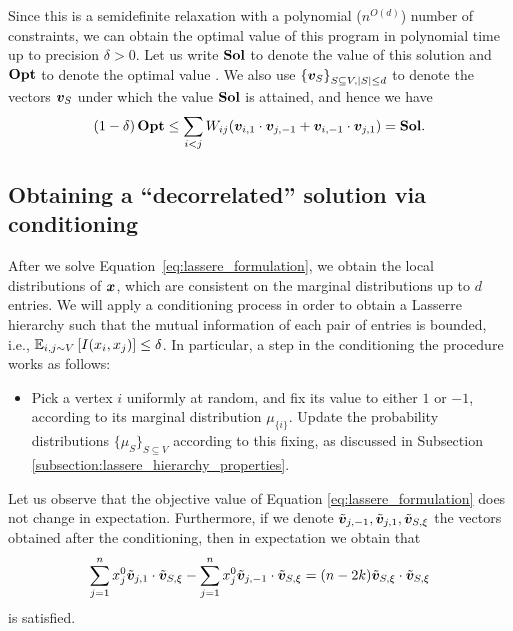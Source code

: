 Since this is a semidefinite relaxation with a polynomial ($n^{O(d)}$) number of
constraints, we can obtain the optimal value of this program in polynomial time
up to precision $\delta>0$. Let us write $\mathbf{Sol}$ to denote the value of this solution and $\OPT$ to denote the optimal value \maxcutkc. We also use $\left \{\bm{v}_S\right\}_{S \subseteq V, |S| \leq d}$ to denote the vectors $\bm{v}_S$  under which the value $\mathbf{Sol}$ is attained, and hence we have 
\begin{equation*}
	(1-\delta)\OPT \leq  \sum_{ i < j } W_{ij} (\vecv_{i,1} \cdot \vecv_{j,-1} + \vecv_{i,-1} \cdot \vecv_{j,1}) = \Sol.
\end{equation*}


\subsection{Obtaining a ``decorrelated'' solution via conditioning}
\label{appendix:lasserre:decorrelate}

After we solve Equation~\eqref{eq:lassere_formulation}, we obtain the local distributions of $\bm{x}$, which are consistent on the marginal distributions up to $d$ entries. 
We will apply a conditioning process in order to obtain a Lasserre hierarchy
such that the mutual information of each pair of entries is bounded, i.e.,
$\operatorname*{\mathbb{E}}_{i,j \sim V} \left[ I(x_i, x_j)\right] \leq \delta$. In particular, a step in the conditioning 
the procedure works as follows: 
\begin{itemize}
	\item[] Pick a vertex $i$ uniformly at random, and fix its value to either $1$ or $-1$, according to its marginal distribution $\mu_{\{i\}}$. Update the probability distributions $\{\mu_{S}\}_{S \subseteq V}$ according to this fixing, as discussed in Subsection \ref{subsection:lassere_hierarchy_properties}.
\end{itemize}
Let us observe that the objective value of Equation \eqref{eq:lassere_formulation} does not change in expectation. 
Furthermore, if we denote $\tilde{\bm{v}}_{j, -1}, \tilde{\bm{v}}_{j, 1}, \tilde{\bm{v}}_{S, \xi}$ the vectors obtained after the conditioning,
then in expectation we obtain that
\begin{equation*}
\sum_{j=1}^n x_j^0 \tilde{\bm{v}}_{j,1} \cdot \tilde{\bm{v}}_{S,\xi} - \sum_{j=1}^n x_j^0 \tilde{\bm{v}}_{j,-1} \cdot \tilde{\bm{v}}_{S,\xi} = (n-2k) \tilde{\bm{v}}_{S,\xi} \cdot \tilde{\bm{v}}_{S,\xi}
\end{equation*}
is satisfied. 



